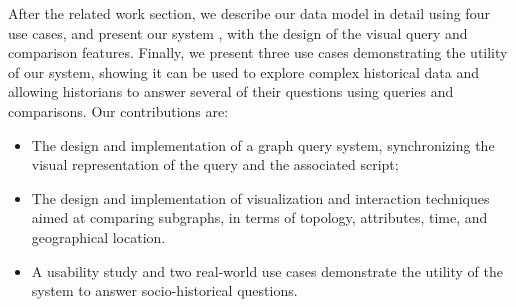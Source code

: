 

After the related work section, we describe our data model in detail using four use cases, and present our system \name, with the design of the visual query and comparison features.
Finally, we present three use cases demonstrating the utility of our system, showing it can be used to explore complex historical data and allowing  historians to answer several of their questions using queries and comparisons.
Our contributions are:
\begin{itemize}
    \item The design and implementation of a graph query system, synchronizing the visual representation of the query and the associated script;
    \item The design and implementation of visualization and interaction techniques aimed at comparing subgraphs, in terms of topology, attributes, time, and geographical location.
    \item A  usability study and two real-world use cases demonstrate the utility of the system to answer socio-historical questions.
\end{itemize}



